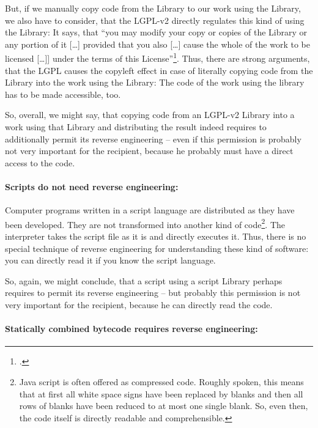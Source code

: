 But, if we manually copy code from the Library to our work using the Library, we
also have to consider, that the LGPL-v2 directly regulates this kind of using
the Library: It says, that \enquote{you may modify your copy or copies of the
Library or any portion of it [\ldots] provided that you also [\ldots] cause the
whole of the work to be licensed [\ldots]] under the terms of this
License}\footcite[cf.][\nopage wp.,§2, escpcially §2c]{Lgpl21OsiLicense1999a}.
Thus, there are strong arguments, that the LGPL causes the copyleft effect in
case of literally copying code from the Library into the work using the Library:
The code of the work using the library has to be made accessible, too.

So, overall, we might say, that copying code from an LGPL-v2 Library into a work
using that Library and distributing the result indeed requires to additionally
permit its reverse engineering -- even if this permission is probably not very
important for the recipient, because he probably must have a direct access to
the code.

\paragraph{Scripts do not need reverse engineering:}

Computer programs written in a script language are distributed as they have been
developed. They are not transformed into another kind of code\footnote{Java
script is often offered as compressed code. Roughly spoken, this means that at
first all white space signs have been replaced by blanks and then all rows of
blanks have been reduced to at most one single blank. So, even then, the code
itself is directly readable and comprehensible.}. The interpreter takes the
script file as it is and directly executes it. Thus, there is no special
technique of reverse engineering for understanding these kind of software: you
can directly read it if you know the script language.

So, again, we might conclude, that a script using a script Library perhaps
requires to permit its reverse engineering -- but probably this permission is
not very important for the recipient, because he can directly read the code.

\paragraph{Statically combined bytecode requires reverse engineering:}

